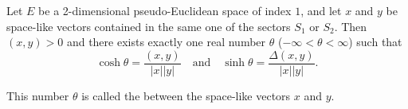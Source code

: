 Let $E$ be a 2-dimensional pseudo-Euclidean space of index $1$, and let $x$ and $y$ be space-like vectors contained in the same one of the sectors $S_1$ or $S_2$. Then $(x, y) > 0$ and there exists exactly one real number $\theta$ ($-\infty < \theta < \infty$) such that
$$\cosh \theta = \frac{(x, y)}{|x| |y|} \quad \text{and} \quad \sinh \theta = \frac{\Delta(x, y)}{|x| |y|}.$$

This number $\theta$ is called the  between the space-like vectors $x$ and $y$.
